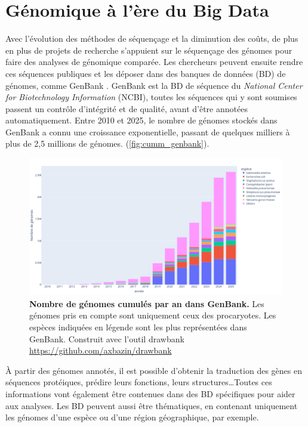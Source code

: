 \section{Génomique à l'ère du Big Data}
\label{sec:db}
Avec l'évolution des méthodes de séquençage et la diminution des coûts, de plus en plus de projets de recherche s'appuient sur le séquençage des génomes pour faire des analyses de génomique comparée. Les chercheurs peuvent ensuite rendre ces séquences publiques et les déposer dans des banques de données (BD) de génomes, comme GenBank \cite{burks_genbank_1985}. GenBank est la BD de séquence du \textit{National Center for Biotechnology Information} (NCBI), toutes les séquences qui y sont soumises passent un contrôle d'intégrité et de qualité, avant d'être annotées automatiquement. Entre 2010 et 2025, le nombre de génomes stockés dans GenBank a connu une croissance exponentielle,  passant de quelques milliers à plus de 2,5 millions de génomes. (\autoref{fig:cumm_genbank}).

\begin{figure}[htbp]
    \centering
    \includegraphics[width=\linewidth]{images/cummulativeGenomesGenBank.png}
    \caption[Nombre de génomes cumulés par an dans GenBank]{\textbf{Nombre de génomes cumulés par an dans GenBank.} Les génomes pris en compte sont uniquement ceux des procaryotes. Les espèces indiquées en légende sont les plus représentées dans GenBank. Construit avec l'outil drawbank \url{https://github.com/axbazin/drawbank}}
    \label{fig:cumm_genbank}
\end{figure}

À partir des génomes annotés, il est possible d'obtenir la traduction des gènes en séquences protéiques, prédire leurs fonctions, leurs structures\dots Toutes ces informations vont également être contenues dans des BD spécifiques pour aider aux analyses. Les BD peuvent aussi être thématiques, en contenant uniquement les génomes d'une espèce ou d'une région géographique, par exemple.

